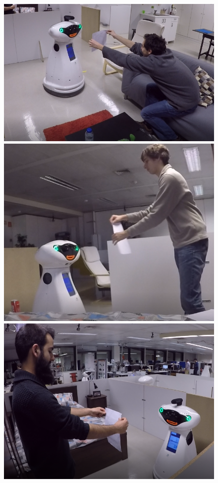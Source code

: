 \begin{figure}[H]
    \centering
        \includegraphics[scale=0.3]{images/realtest1}
        \includegraphics[scale=0.37]{images/realtest3}
        \includegraphics[scale=0.27]{images/realtest2}

\end{figure}
